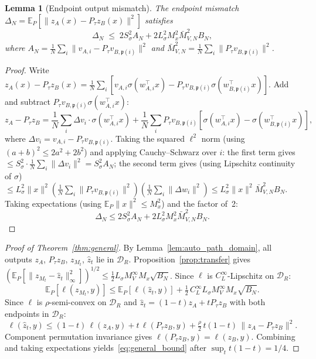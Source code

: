 \documentclass[11pt]{article}
\newtheorem{lemma}[theorem]{Lemma}
\newcommand{\E}{\mathbb{E}}
\newcommand{\cB}{\mathcal{B}}
\newcommand{\cD}{\mathcal{D}}  %
\newcommand{\nperm}{\mathfrak{p}}  %
\begin{document}
\begin{lemma}[Endpoint output mismatch]\label{lem:delta_control}
The endpoint mismatch
$\Delta_N = \E_P[\|z_A(x) - P_\tau z_B(x)\|^2]$ satisfies
\[
  \Delta_N \;\le\; 2 S_\sigma^2 A_N
  + 2 L_\sigma^2 M_x^2 \bar M_{V,N}^2 B_N,
\]
where $A_N = \frac{1}{N}\sum_i \|v_{A,i} - P_\tau v_{B,\nperm(i)}\|^2$
and $\bar M_{V,N}^2 = \frac{1}{N}\sum_i \|P_\tau v_{B,\nperm(i)}\|^2$.
\end{lemma}
\begin{proof}
Write
$z_A(x) - P_\tau z_B(x)
= \frac{1}{N}\sum_i [v_{A,i} \sigma(w_{A,i}^\top x)
- P_\tau v_{B,\nperm(i)} \sigma(w_{B,\nperm(i)}^\top x)]$.
Add and subtract $P_\tau v_{B,\nperm(i)} \sigma(w_{A,i}^\top x)$:
\[
  z_A - P_\tau z_B
  = \frac{1}{N}\sum_i \Delta v_i \cdot \sigma(w_{A,i}^\top x)
  + \frac{1}{N}\sum_i P_\tau v_{B,\nperm(i)}
  [\sigma(w_{A,i}^\top x) - \sigma(w_{B,\nperm(i)}^\top x)],
\]
where $\Delta v_i = v_{A,i} - P_\tau v_{B,\nperm(i)}$. Taking the squared
$\ell^2$ norm (using $(a+b)^2 \le 2a^2 + 2b^2$) and applying
Cauchy--Schwarz over $i$: the first term gives
$\le S_\sigma^2 \cdot \frac{1}{N}\sum_i \|\Delta v_i\|^2 = S_\sigma^2 A_N$;
the second term gives (using Lipschitz continuity of $\sigma$)
$\le L_\sigma^2 \|x\|^2 (\frac{1}{N}\sum_i \|P_\tau v_{B,\nperm(i)}\|^2)
(\frac{1}{N}\sum_i \|\Delta w_i\|^2)
\le L_\sigma^2 \|x\|^2 \bar M_{V,N}^2 B_N$.
Taking expectations (using $\E_P\|x\|^2 \le M_x^2$) and the factor of~2:
\begin{equation}\label{eq:delta_bound}
  \Delta_N \le 2 S_\sigma^2 A_N
  + 2 L_\sigma^2 M_x^2 \bar M_{V,N}^2 B_N.
\end{equation}
\end{proof}

\begin{proof}[Proof of Theorem~\ref{thm:general}]
By Lemma~\ref{lem:auto_path_domain}, all outputs
$z_A$, $P_\tau z_B$, $z_{M_t}$, $\hat z_t$ lie in $\cD_R$.
Proposition~\ref{prop:transfer} gives
$(\E_P[\|z_{M_t} - \hat z_t\|_\infty^2])^{1/2}
\le \tfrac{1}{2} L_\sigma M_V^\infty M_x \sqrt{B_N}$.
Since $\ell$ is $C_L^\infty$-Lipschitz on $\cD_R$:
\[
  \E_P[\ell(z_{M_t}, y)]
  \le \E_P[\ell(\hat z_t, y)]
  + \tfrac{1}{2}\,C_L^\infty L_\sigma M_V^\infty M_x \sqrt{B_N}.
\]
Since $\ell$ is $\rho$-semi-convex on $\cD_R$
and $\hat z_t = (1-t)z_A + tP_\tau z_B$ with both endpoints in $\cD_R$:
\[
  \ell(\hat z_t, y)
  \le (1-t)\,\ell(z_A, y) + t\,\ell(P_\tau z_B, y)
  + \tfrac{\rho}{2}\,t(1-t)\,\|z_A - P_\tau z_B\|^2.
\]
Component permutation invariance gives
$\ell(P_\tau z_B, y) = \ell(z_B, y)$.
Combining and taking expectations yields~\eqref{eq:general_bound}
after $\sup_t t(1-t) = 1/4$.
\end{proof}
\end{document}
